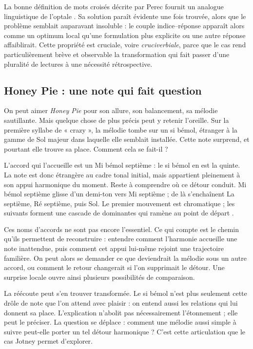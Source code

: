 \documentclass[11pt,a4paper]{article}
\begin{document}
La bonne définition de mots croisés décrite par Perec fournit un analogue
linguistique de l'optale \parencite{perec1999motscroises}. Sa solution paraît
évidente une fois trouvée, alors que le problème semblait auparavant insoluble : le
couple indice--réponse apparaît alors comme un optimum local qu'une formulation
plus explicite ou une autre réponse affaiblirait. Cette propriété est cruciale,
voire \emph{cruciverbiale}, parce que le cas rend particulièrement brève et
observable la transformation qui fait passer d'une pluralité de lectures à une
nécessité rétrospective.

\subsection{Honey Pie : une note qui fait question}
\label{sec:honey-pie}

On peut aimer \emph{Honey Pie} pour son allure, son balancement, sa mélodie sautillante.
Mais quelque chose de plus précis peut y retenir l'oreille. Sur la première syllabe
de « crazy », la mélodie tombe sur un si bémol, étranger à la gamme de Sol majeur
dans laquelle elle semblait installée. Cette note surprend, et pourtant elle trouve
sa place. Comment cela se fait-il ?

L'accord qui l'accueille est un Mi bémol septième : le si bémol en est la quinte.
La note est donc étrangère au cadre tonal initial, mais appartient pleinement à son
appui harmonique du moment. Reste à comprendre où ce détour conduit. Mi bémol
septième glisse d'un demi-ton vers Mi septième ; de là s'enchaînent La septième,
Ré septième, puis Sol. Le premier mouvement est chromatique ; les suivants forment
une cascade de dominantes qui ramène au point de départ
\parencite{blick2013honeypie,pollack1998honeypie}.

Ces noms d'accords ne sont pas encore l'essentiel. Ce qui compte est le chemin
qu'ils permettent de reconstruire : entendre comment l'harmonie accueille une note
inattendue, puis comment cet appui lui-même rejoint une trajectoire familière. On
peut alors se demander ce que deviendrait la mélodie sous un autre accord, ou comment
le retour changerait si l'on supprimait le détour. Une surprise locale ouvre ainsi
plusieurs possibilités de comparaison.

La réécoute peut s'en trouver transformée. Le si bémol n'est plus seulement cette
drôle de note que l'on attend avec plaisir : on entend aussi les relations qui lui
donnent sa place. L'explication n'abolit pas nécessairement l'étonnement ; elle peut
le préciser. La question se déplace : comment une mélodie aussi simple à suivre
peut-elle porter un tel détour harmonique ? C'est cette articulation que le cas
Jotney permet d'explorer.
\end{document}
